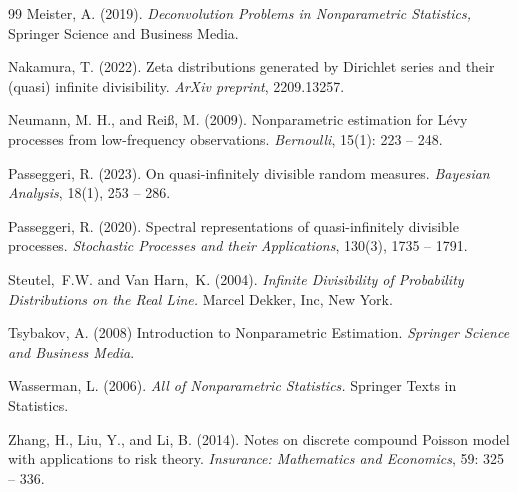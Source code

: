 \documentclass[a4paper,11pt]{article}
\theoremstyle{definition}
\newcommand{\1}{\mathbb{I}}
\theoremstyle{remark}
\begin{document}
\begin{thebibliography}{99}
  Meister, A. (2019). \textit{Deconvolution Problems in Nonparametric Statistics,} Springer Science and Business Media.

 Nakamura, T. (2022). Zeta distributions generated by Dirichlet series and their (quasi) infinite divisibility. \textit{ArXiv preprint}, 2209.13257.




 Neumann, M. H., and Rei{\ss}, M. (2009). Nonparametric estimation for L{\'e}vy processes from low-frequency observations. \textit{Bernoulli}, 15(1): 223 -- 248.

 Passeggeri, R. (2023). On quasi-infinitely divisible random measures. \textit{Bayesian Analysis}, 18(1), 253 -- 286.

 Passeggeri, R. (2020). Spectral representations of quasi-infinitely divisible processes. \textit{Stochastic Processes and their Applications}, 130(3), 1735 -- 1791.

Steutel,~F.W. and Van Harn,~K. (2004). \textit{Infinite Divisibility of Probability Distributions on the Real Line.} Marcel Dekker, Inc, New York.

        Tsybakov, A. (2008) Introduction to Nonparametric Estimation. \textit{Springer Science and Business Media}.

 Wasserman, L. (2006). \textit{All of Nonparametric Statistics.}  Springer Texts in Statistics.
        
 Zhang, H., Liu, Y., and Li, B. (2014). Notes on discrete compound Poisson model with
applications to risk theory.  \textit{Insurance: Mathematics and Economics}, 59: 325 -- 336.
\end{thebibliography}
\end{document}

